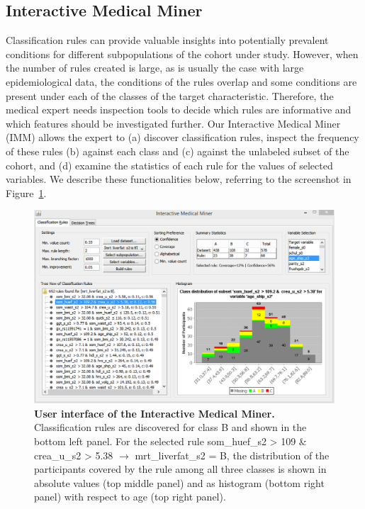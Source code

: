 \documentclass[
  oneside]{book}
\begin{document}
\hypertarget{imm-workflow-imm}{%
\subsection{Interactive Medical Miner}\label{imm-workflow-imm}}

Classification rules can provide valuable insights into potentially prevalent conditions for different subpopulations of the cohort under study.
However, when the number of rules created is large, as is usually the case with large epidemiological data, the conditions of the rules overlap and some conditions are present under each of the classes of the target characteristic.
Therefore, the medical expert needs inspection tools to decide which rules are informative and which features should be investigated further.
Our Interactive Medical Miner (IMM) allows the expert to (a) discover classification rules, inspect the frequency of these rules (b) against each class and (c) against the unlabeled subset of the cohort, and (d) examine the statistics of each rule for the values of selected variables.
We describe these functionalities below, referring to the screenshot in Figure~\ref{fig:03-imm-modified}.



\begin{figure}[h]

{\centering \includegraphics[width=1\linewidth]{figures/03-imm-modified} 

}

\caption{\textbf{User interface of the Interactive Medical Miner.} Classification rules are discovered for class B and shown in the bottom left panel. For the selected rule som\_huef\_s2 \textgreater{} 109 \& crea\_u\_s2 \textgreater{} 5.38 \(\longrightarrow\) mrt\_liverfat\_s2 = B, the distribution of the participants covered by the rule among all three classes is shown in absolute values (top middle panel) and as histogram (bottom right panel) with respect to age (top right panel).}\label{fig:03-imm-modified}
\end{figure}
\end{document}
